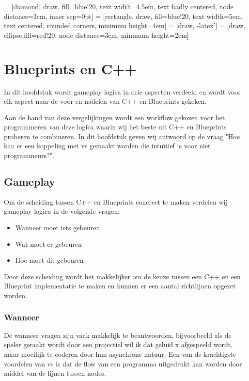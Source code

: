 \lstset {language=C++}
 = [diamond, draw, fill=blue!20, 
    text width=4.5em, text badly centered, node distance=3cm, inner sep=0pt]
 = [rectangle, draw, fill=blue!20, 
    text width=5em, text centered, rounded corners, minimum height=4em]
 = [draw, -latex']
 = [draw, ellipse,fill=red!20, node distance=3cm,
    minimum height=2em]

\chapter{Blueprints en C++}
\label{ch:BlueprintsEnCpp}

In dit hoofdstuk wordt gameplay logica in drie aspecten verdeeld en wordt voor elk aspect naar de voor en nadelen van C++ en Blueprints gekeken.

Aan de hand van deze vergelijkingen wordt een workflow gekozen voor het programmeren van deze logica waarin wij het beste uit C++ en Blueprints proberen te combineren.
In dit hoofdstuk geven wij antwoord op de vraag "Hoe kan er een koppeling met \gls{vs} gemaakt worden die intuïtief is voor niet programmeurs?".

\section{Gameplay}

Om de scheiding tussen C++ en Blueprints concreet te maken verdelen wij gameplay logica in de volgende vragen:

\begin{itemize}
	\item Wanneer moet iets gebeuren
	\item Wat moet er gebeuren
	\item Hoe moet dit gebeuren
\end{itemize}

Door deze scheiding wordt het makkelijker om de keuze tussen een C++ en een Blueprint implementatie te maken en kunnen er een aantal richtlijnen opgezet worden.

\subsection{Wanneer}
De wanneer vragen zijn vaak makkelijk te beantwoorden, bijvoorbeeld als de speler geraakt wordt door een projectiel wil ik dat geluid x afgespeeld wordt, maar moeilijk te coderen door hun asynchrone natuur. Een van de krachtigste voordelen van \gls{vs} is dat de flow van een programma uitgedrukt kan worden door middel van de lijnen tussen nodes. 

